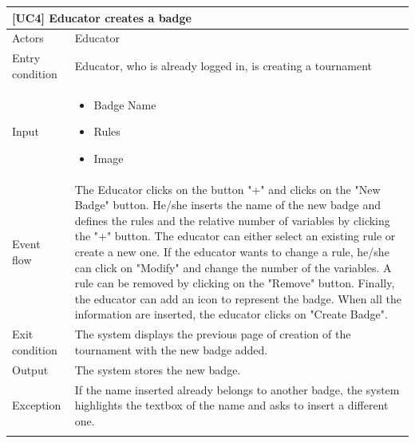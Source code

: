 \documentclass[12pt,oneside,a4paper]{article}
\begin{document}
\begin{table}[htbp]
\begin{tabular}{|l|p{12cm}|}
    \hline
    \multicolumn{2}{|l|}{\textbf{[UC4] Educator creates a badge}}\\
    \hline
    Actors & Educator\\
    \hline
    Entry condition & Educator, who is already logged in, is creating a tournament\\
    \hline
    Input & \begin{itemize}
        \item Badge Name
        \item Rules
        \item Image
    \end{itemize}\\
    \hline
    Event flow & The Educator clicks on the button "+" and clicks on the "New Badge" button. He/she inserts the name of the new badge and defines the rules and the relative number of variables by clicking the "+" button. The educator can either select an existing rule or create a new one. If the educator wants to change a rule, he/she can click on "Modify" and change the number of the variables. A rule can be removed by clicking on the "Remove" button. Finally, the educator can add an icon to represent the badge. When all the information are inserted, the educator clicks on "Create Badge".\\
    \hline
    Exit condition & The system displays the previous page of creation of the tournament with the new badge added.\\
    \hline
    Output & The system stores the new badge.\\
    \hline
    Exception & If the name inserted already belongs to another badge, the system highlights the textbox of the name and asks to insert a different one.\\
    \lasthline
\end{tabular}
\end{table}
\end{document}
